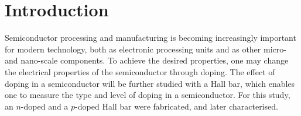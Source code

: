 \section{Introduction}





Semiconductor processing and manufacturing is becoming increasingly important for modern technology, both as electronic processing units and as other micro- and nano-scale components. To achieve the desired properties, one may change the electrical properties of the semiconductor through doping. The effect of doping in a semiconductor will be further studied with a Hall bar, which enables one to measure the type and level of doping in a semiconductor. For this study, an $n$-doped and a $p$-doped Hall bar were fabricated, and later characterised.

